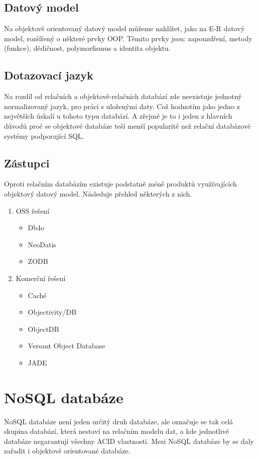 \subsection{Datový model}
Na objektově orientovaný datový model můžeme nahlížet, jako na E-R datový model, rozšířený o některé prvky OOP. Těmito prvky jsou: zapouzdření, metody (funkce), dědičnost, polymorfismus a identita objektu.

\subsection{Dotazovací jazyk}
Na rozdíl od relačních a objektově-relačních databází zde neexistuje jednotný normalizovaný jazyk, pro práci s uloženými daty. Což hodnotím jako jedno z největších úskalí u tohoto typu databází. A zřejmě je to i jeden z hlavních důvodů proč se objektové databáze teší menší popularitě než relační databázové systémy podporující SQL.
 
\subsection{Zástupci}
Oproti relačním databázím existuje podstatně méně produktů využívajících objektový datový model. Následuje přehled některých z nich.
\begin{enumerate}
  \item OSS řešení
  \begin{itemize}
    \item Db4o
    \item NeoDatis
    \item ZODB
  \end{itemize}
  \item Komerční řešení
  \begin{itemize}
    \item Caché
    \item Objectivity/DB
    \item ObjectDB
    \item Versant Object Database
    \item JADE
  \end{itemize}
\end{enumerate}

\section{NoSQL databáze}
NoSQL databáze není jeden určitý druh databáze, ale označuje se tak celá skupina databází, která nestaví na relačním modelu dat, a kde jednotlivé databáze negarantují všechny ACID vlastnosti. Mezi NoSQL databáze by se daly zařadit i objektově orientované databáze.

